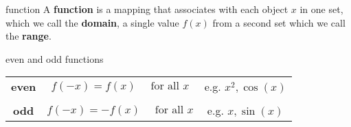 \documentclass[fronts,frame,grid,avery5388]{flashcards}
\begin{document}
\begin{flashcard}[Definition]{function}
A \textbf{function} is a mapping that associates with each object $x$ in one
set, which we call the \textbf{domain}, a single value $f(x)$ from a second set
which we call the \textbf{range}.
\end{flashcard}

\begin{flashcard}[Definition]{even and odd functions}
\begin{tabular}{ccc}
\textbf{even} & $f(-x) = f(x) \quad \text{ for all } x$ & e.g. $x^{2}, \cos(x)$\\
\\
\textbf{odd} & $f(-x) =  -f(x) \quad \text{ for all } x$ & e.g. $x, \sin(x)$\\
\end{tabular} 
\end{flashcard}
\end{document}
